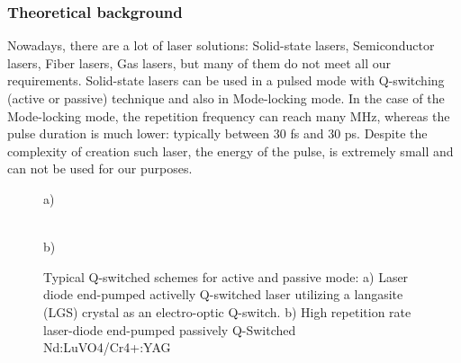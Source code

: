 \subsubsection{Theoretical background}
Nowadays, there are a lot of laser solutions: Solid-state lasers, Semiconductor lasers, Fiber lasers, Gas lasers, but many of them do not meet all our requirements.
Solid-state lasers can be used in a pulsed mode with Q-switching (active or passive) technique and also in Mode-locking mode. In the case of the Mode-locking mode, the repetition frequency can reach many MHz, whereas the pulse duration is much lower: typically between 30 fs and 30 ps. Despite the complexity of creation such laser, the energy of the pulse, is extremely small and can not be used for our purposes.


\begin{figure}[H]
\begin{minipage}[h]{0.52\linewidth}
 a) \\
\end{minipage}
\hfill
\begin{minipage}[h]{0.45\linewidth}
 \\b)
\end{minipage}


\caption{Typical Q-switched schemes for active and passive mode:
a) Laser diode end-pumped activelly Q-switched laser utilizing a langasite (LGS) crystal as an electro-optic Q-switch.
b) High repetition rate laser-diode end-pumped passively Q-Switched Nd:LuVO4/Cr4+:YAG
}
\label{fig:qs_lasers}
\end{figure}

